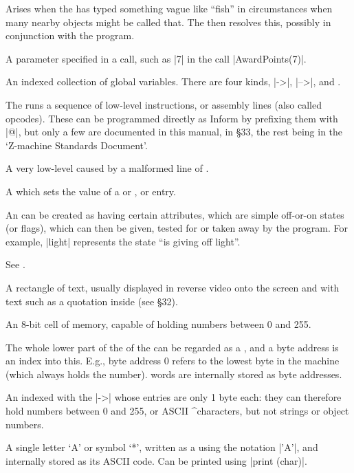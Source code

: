 %
Arises when the  has typed something vague like ``fish''
in circumstances when many nearby objects might be called that.  The
 then resolves this, possibly in conjunction with the program.

%
A parameter specified in a  call, such as |7| in the call
|AwardPoints(7)|.

%
An indexed collection of global variables.  There are four kinds,
 |->|,  |-->|,  and
.

%
The  runs a sequence of low-level instructions,
or assembly lines (also called opcodes).  These can be programmed
directly as Inform  by prefixing them with |@|, but
only a few are documented in this manual, in \S 33, the rest
being in the `Z-machine Standards Document'.

%
A very low-level  caused by a malformed line of
.

%
A  which sets the value of a  or , or  entry.

%
An  can be created as having certain attributes, which
are simple off-or-on states (or flags), which can then be
given, tested for or taken away by the program.  For example,
|light| represents the state ``is giving off light''.

%
See .

%
A rectangle of text, usually displayed in reverse video onto the
screen and with text such as a quotation inside (see \S 32).

%
An 8-bit cell of memory, capable of holding numbers between 0
and 255.

%
The whole lower part of the  of the 
can be regarded as a , and a byte address is an
index into this.  E.g., byte address 0 refers to the lowest byte
in the machine (which always holds the  number).
 words are internally stored as byte addresses.

%
An  indexed with the |->|  whose entries are
only 1 byte each: they can therefore hold numbers between 0 and 255,
or ASCII ^{characters}, but not strings or object numbers.

%
A single letter `A' or symbol `*', written as a  using
the notation |'A'|, and internally stored as its ASCII code.  Can
be printed using |print (char)|.


